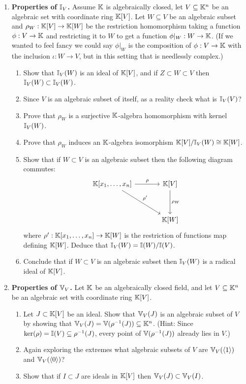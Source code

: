 \documentclass[12pt,reqno]{amsart}
\begin{document}
\begin{enumerate}[leftmargin=*]
\item\label{ex:hilb3-1} \textbf{Properties of $\mathbb{I}_V$.} Assume $\mathbb{K}$ is algebraically closed, let $V\subseteq \mathbb{K}^n$ be an algebraic set with coordinate ring $\mathbb{K}[V]$. Let $W\subseteq V$ be an algebraic subset and $\rho_{W}: \mathbb{K}[V] \to \mathbb{K}[W]$ be the restriction homomorphism taking a function $\phi:V \to \mathbb{K}$ and restricting it to $W$ to get a function $\phi|_{W}:W\to \mathbb{K}$. (If we wanted to feel fancy we could say $\phi|_{W}$ is the composition of $\phi:V\to \mathbb{K}$ with the inclusion $\iota:W\to V$, but in this setting that is needlessly complex.) 
\begin{enumerate}[label=(\alph*),ref=\theenumi\alph*]
	\item Show that $\mathbb{I}_V(W)$ is an ideal of $\mathbb{K}[V]$, and if $Z \subset W \subset V$ then $\mathbb{I}_{V}(W) \subset \mathbb{I}_{V}(W)$.
	\item Since $V$ is  an algebraic subset of itself, as a reality check what is $\mathbb{I}_{V}(V)$?
	\item Prove that $\rho_{W}$ is a surjective $\mathbb{K}$-algebra homomorphism with kernel $\mathbb{I}_V(W)$. 
	\item Prove that $\rho_W$ induces an $\mathbb{K}$-algebra isomorphism $\mathbb{K}[V]/\mathbb{I}_{V}(W) \cong \mathbb{K}[W]$. 
	\item Show that if $W \subset V$ is an algebraic subset then the following diagram commutes:
	\[
		\begin{tikzcd}[row sep = 3.5em, column sep = 3.5em]
		\KK[x_1,\ldots,x_n] \arrow[r, "\rho"]  \arrow[dr,"\rho'"]& \KK[V] \arrow[d, "\rho_W"]\\
		& \KK[W]
		\end{tikzcd}
	\]
	where $\rho':\mathbb{K}[x_1,\ldots,x_n] \to \mathbb{K}[W]$ is the restriction of functions map defining $\mathbb{K}[W]$. Deduce that $\mathbb{I}_{V}(W) = \mathbb{I}(W)/\mathbb{I}(V)$. 
	\item Conclude that if $W \subset V$ is an algebraic subset then $\mathbb{I}_V(W)$ is a radical ideal of $\mathbb{K}[V]$.
\end{enumerate}

\item\label{ex:hilb3-2} \textbf{Properties of $\mathbb{V}_V$.} Let $\mathbb{K}$ be an algebraically closed field, and let $V\subseteq \mathbb{K}^n$ be an algebraic set with coordinate ring $\mathbb{K}[V]$.
\begin{enumerate}[label=(\alph*),ref=\theenumi\alph*]
	\item  Let $J \subset \mathbb{K}[V]$ be an ideal.  Show that $\mathbb{V}_V(J)$ is an algebraic subset of $V$ by showing that $\mathbb{V}_V(J)=\mathbb{V}(\rho^{-1}(J))\subseteq \mathbb{K}^n$. (Hint: Since $\ker(\rho)=\mathbb{I}(V)\subseteq \rho^{-1}(J)$, every point of $\mathbb{V}(\rho^{-1}(J))$ already lies in $V$.)
	\item Again exploring the extremes what algebraic subsets of $V$ are $\mathbb{V}_{V}(\langle 1 \rangle)$ and $\mathbb{V}_{V}(\langle 0\rangle)$?
	\item Show that if $I \subset J$ are ideals in $\mathbb{K}[V]$ then $\mathbb{V}_{V}(J) \subset \mathbb{V}_{V}(I)$. 
\end{enumerate}



\end{enumerate}
\end{document}
